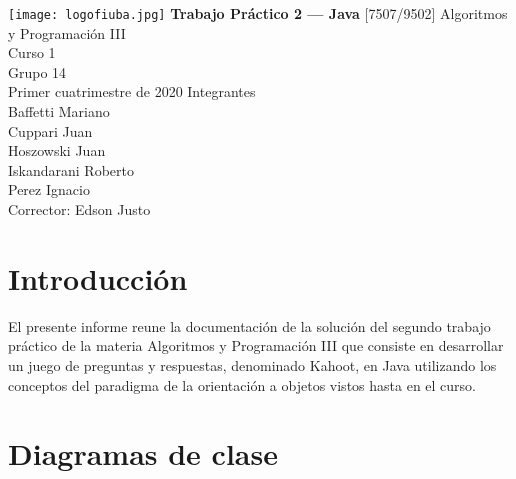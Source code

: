 \documentclass[titlepage,a4paper]{article}
\begin{document}
\begin{titlepage} %
	\hfill\texttt{[image: logofiuba.jpg]}
    \centering
    \vfill
    \Huge \textbf{Trabajo Práctico 2 — Java}
    \vskip2cm
    \Large [7507/9502] Algoritmos y Programación III\\
    Curso 1 \\ %
    Grupo 14 \\
    Primer cuatrimestre de 2020 
    \vfill
    Integrantes\\[1\baselineskip]
    
    Baffetti Mariano\\
    Cuppari Juan\\
    Hoszowski Juan\\
    Iskandarani Roberto\\
    Perez Ignacio\\
    \vfill
    Corrector: Edson Justo
    \vfill
\end{titlepage}

\tableofcontents %
\newpage

\section{Introducción}\label{sec:intro}
El presente informe reune la documentación de la solución del segundo trabajo práctico de la materia Algoritmos y Programación III que consiste en desarrollar un juego de preguntas y respuestas, denominado Kahoot, en Java utilizando los conceptos del paradigma de la orientación a objetos vistos hasta en el curso.




\section{Diagramas de clase}\label{sec:diagramasdeclase}
\end{document}
